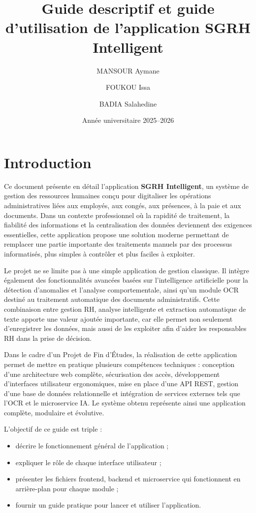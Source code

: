 \documentclass[12pt,a4paper]{report}
\title{Guide descriptif et guide d'utilisation de l'application SGRH Intelligent}
\author{MANSOUR Aymane \and FOUKOU Issa \and BADIA Salahedine}
\date{Année universitaire 2025--2026}
\begin{document}
\sloppy

\maketitle
\tableofcontents
\newpage

\chapter*{Introduction}

Ce document présente en détail l'application \textbf{SGRH Intelligent}, un système de gestion des ressources humaines conçu pour digitaliser les opérations administratives liées aux employés, aux congés, aux présences, à la paie et aux documents. Dans un contexte professionnel où la rapidité de traitement, la fiabilité des informations et la centralisation des données deviennent des exigences essentielles, cette application propose une solution moderne permettant de remplacer une partie importante des traitements manuels par des processus informatisés, plus simples à contrôler et plus faciles à exploiter.

Le projet ne se limite pas à une simple application de gestion classique. Il intègre également des fonctionnalités avancées basées sur l'intelligence artificielle pour la détection d'anomalies et l'analyse comportementale, ainsi qu'un module OCR destiné au traitement automatique des documents administratifs. Cette combinaison entre gestion RH, analyse intelligente et extraction automatique de texte apporte une valeur ajoutée importante, car elle permet non seulement d'enregistrer les données, mais aussi de les exploiter afin d'aider les responsables RH dans la prise de décision.

Dans le cadre d'un Projet de Fin d'Études, la réalisation de cette application permet de mettre en pratique plusieurs compétences techniques : conception d'une architecture web complète, sécurisation des accès, développement d'interfaces utilisateur ergonomiques, mise en place d'une API REST, gestion d'une base de données relationnelle et intégration de services externes tels que l'OCR et le microservice IA. Le système obtenu représente ainsi une application complète, modulaire et évolutive.

L'objectif de ce guide est triple :
\begin{itemize}
    \item décrire le fonctionnement général de l'application ;
    \item expliquer le rôle de chaque interface utilisateur ;
    \item présenter les fichiers frontend, backend et microservice qui fonctionnent en arrière-plan pour chaque module ;
    \item fournir un guide pratique pour lancer et utiliser l'application.
\end{itemize}
\end{document}
